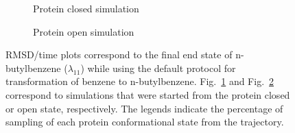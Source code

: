 \documentclass[T4paper.tex]{subfiles}
\begin{document}
\begin{figure}[!h]
\begin{subfigure}{\textwidth}
   \centering
    \caption{Protein closed simulation}
   \label{fig:c_exp_opls3_11/RMSD-replica11}
\end{subfigure}
\centering
\begin{subfigure}{\textwidth}
  \centering
   \caption{Protein open simulation}
   \label{fig:o_exp_opls3_24/RMSD-replica11}
\end{subfigure}%
\caption{RMSD/time plots correspond to the final end state of n-butylbenzene ($\lambda_{11}$) while using the default protocol for transformation of benzene to n-butylbenzene. Fig.~\ref{fig:c_exp_opls3_11/RMSD-replica11} and Fig.~\ref{fig:o_exp_opls3_24/RMSD-replica11} 
correspond to simulations that were started from the protein closed or open state, respectively. The legends indicate the percentage of sampling of each protein conformational state from the trajectory.}
\label{fig:benzene_to_n-butyl}
\end{figure}
\end{document}
